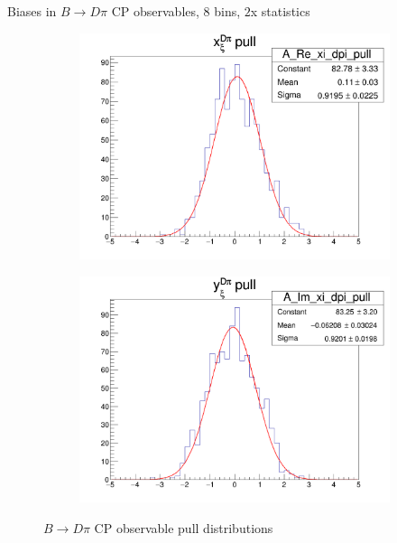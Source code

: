\documentclass{beamer}
\begin{document}
\begin{frame}{Biases in $B\to D\pi$ CP observables, $8$ bins, $2$x statistics}
  \begin{figure}
    \centering
    \vspace{-0.2cm}
    \begin{subfigure}{0.5\textwidth}
      \includegraphics[width = 1.0\textwidth]{A_Re_xi_dpi_8Bins_StatsMultiplier2_pull.png}
    \end{subfigure}%
    \begin{subfigure}{0.5\textwidth}
      \includegraphics[width = 1.0\textwidth]{A_Im_xi_dpi_8Bins_StatsMultiplier2_pull.png}
    \end{subfigure}
    \caption{$B\to D\pi$ CP observable pull distributions}
  \end{figure}
\end{frame}
\end{document}
